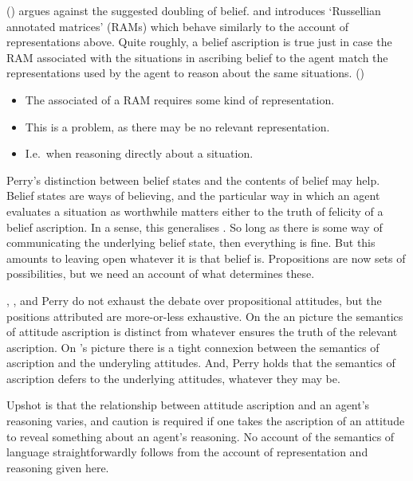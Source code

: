 \documentclass[10pt]{article}
\begin{document}
\citeauthor{Richard:1990aa} (\citeyear[78--85]{Richard:1990aa}) argues against the suggested doubling of belief.
and  introduces `Russellian annotated matrices' (RAMs) which behave similarly to the account of representations above.
Quite roughly, a belief ascription is true just in case the RAM associated with the situations in ascribing belief to the agent match the representations used by the agent to reason about the same situations. (\citeyear[181--190]{Richard:1990aa})
\begin{itemize}
\item The associated of a RAM requires some kind of representation.
\item This is a problem, as there may be no relevant representation.
\item {\color{red} I.e.\ when reasoning directly about a situation.}
\end{itemize}

Perry's distinction between belief states and the contents of belief may help.
Belief states are ways of believing, and the particular way in which an agent evaluates a situation as worthwhile matters either to the truth of felicity of a belief ascription.
In a sense, this generalises \citeauthor{Richard:1990aa}.
So long as there is some way of communicating the underlying belief state, then everything is fine.
But this amounts to leaving open whatever it is that belief is.
Propositions are now sets of possibilities, but we need an account of what determines these.

\citeauthor{Frege:1948aa}, \citeauthor{Richard:1990aa}, and Perry do not exhaust the debate over propositional attitudes, but the positions attributed are more-or-less exhaustive.
On the \citeauthor{Frege:1948aa}an picture the semantics of attitude ascription is distinct from whatever ensures the truth of the relevant ascription.
On \citeauthor{Richard:1990aa}'s picture there is a tight connexion between the semantics of ascription and the underyling attitudes.
And, Perry holds that the semantics of ascription defers to the underlying attitudes, whatever they may be.

Upshot is that the relationship between attitude ascription and an agent's reasoning varies, and caution is required if one takes the ascription of an attitude to reveal something about an agent's reasoning.
No account of the semantics of language straightforwardly follows from the account of representation and reasoning given here.
\end{document}
